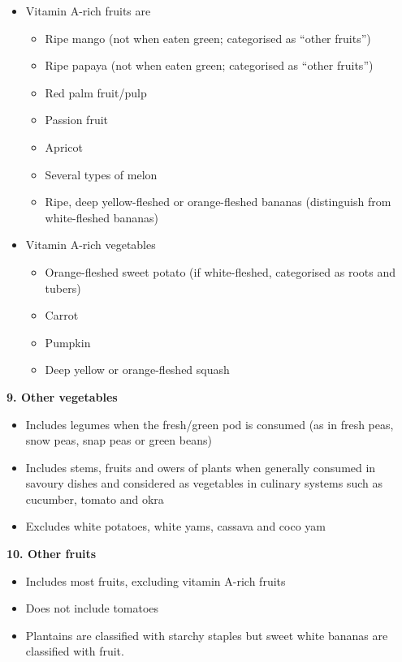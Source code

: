 \documentclass[12pt,]{book}
\providecommand{\tightlist}{%
  \setlength{\itemsep}{0pt}\setlength{\parskip}{0pt}}
\theoremstyle{definition}
\theoremstyle{definition}
\theoremstyle{definition}
\theoremstyle{remark}
\begin{document}
\begin{itemize}
\tightlist
\item
  Vitamin A-rich fruits are

  \begin{itemize}
  \tightlist
  \item
    Ripe mango (not when eaten green; categorised as ``other fruits'')
  \item
    Ripe papaya (not when eaten green; categorised as ``other fruits'')
  \item
    Red palm fruit/pulp
  \item
    Passion fruit
  \item
    Apricot
  \item
    Several types of melon
  \item
    Ripe, deep yellow-fleshed or orange-fleshed bananas (distinguish
    from white-fleshed bananas)
  \end{itemize}
\item
  Vitamin A-rich vegetables

  \begin{itemize}
  \tightlist
  \item
    Orange-fleshed sweet potato (if white-fleshed, categorised as roots
    and tubers)
  \item
    Carrot
  \item
    Pumpkin
  \item
    Deep yellow or orange-fleshed squash
  \end{itemize}
\end{itemize}

\textbf{9. Other vegetables}

\begin{itemize}
\tightlist
\item
  Includes legumes when the fresh/green pod is consumed (as in fresh
  peas, snow peas, snap peas or green beans)
\item
  Includes stems, fruits and owers of plants when generally consumed in
  savoury dishes and considered as vegetables in culinary systems such
  as cucumber, tomato and okra
\item
  Excludes white potatoes, white yams, cassava and coco yam
\end{itemize}

\textbf{10. Other fruits}

\begin{itemize}
\tightlist
\item
  Includes most fruits, excluding vitamin A-rich fruits
\item
  Does not include tomatoes
\item
  Plantains are classified with starchy staples but sweet white bananas
  are classified with fruit.
\end{itemize}
\end{document}
